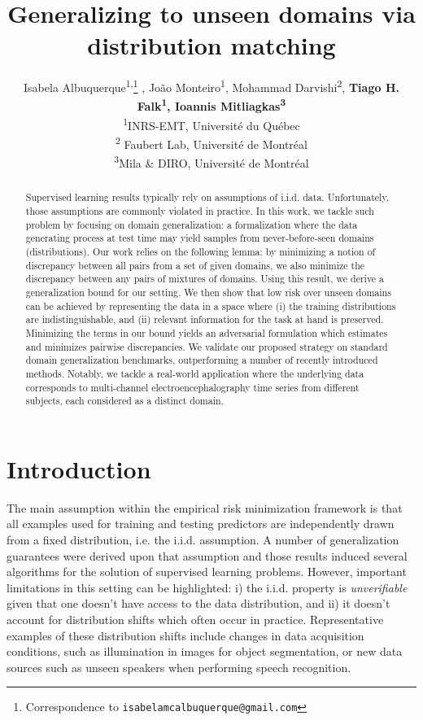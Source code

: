 \documentclass{article}
\title{Generalizing to unseen domains via distribution matching}
\author{Isabela Albuquerque\textsuperscript{1,}\thanks{Correspondence to \texttt{isabelamcalbuquerque@gmail.com}} , Jo\~ao Monteiro\textsuperscript{1}, Mohammad Darvishi\textsuperscript{2}, \textbf{Tiago H. Falk\textsuperscript{1}, Ioannis Mitliagkas\textsuperscript{3}}   
\\
\textsuperscript{1}INRS-EMT, Universit\'e du Qu\'ebec\\
\textsuperscript{2} Faubert Lab, Universit\'e de Montr\'eal \\ 
\textsuperscript{3}Mila \& DIRO, Universit\'e de Montr\'eal}
\begin{document}
\maketitle

\begin{abstract}






Supervised learning results typically rely on assumptions of i.i.d. data. Unfortunately, those assumptions are commonly violated in practice. In this work, we tackle such problem by focusing on domain generalization: a formalization where the data generating process at test time may yield samples from never-before-seen domains (distributions).
Our work relies on the following lemma: by minimizing a notion of discrepancy between all pairs from a set of given domains, we also minimize the discrepancy between any pairs of mixtures of domains. Using this result, we derive a generalization bound for our setting. We then show that low risk over unseen domains can be achieved by representing the data in a space where (i) the training distributions are indistinguishable, and (ii) relevant information for the task at hand is preserved. Minimizing the terms in our bound yields an adversarial formulation which estimates and minimizes pairwise discrepancies.
We validate our proposed strategy on standard domain generalization benchmarks, outperforming a number of recently introduced methods.
Notably, we tackle a real-world application where the underlying data corresponds to multi-channel electroencephalography time series from different subjects, each considered as a distinct domain.



\end{abstract}

\section{Introduction}
The main assumption within the empirical risk minimization framework is that all examples used for training and testing predictors are independently drawn from a fixed distribution, i.e. the i.i.d. assumption. A number of generalization guarantees were derived upon that assumption and those results induced several algorithms for the solution of supervised learning problems. However, important limitations in this setting can be highlighted: i) the i.i.d. property is \emph{unverifiable} \cite{langford2005tutorial} given that one doesn't have access to the data distribution, and  ii) it doesn't account for distribution shifts which often occur in practice. Representative examples of these distribution shifts include changes in data acquisition conditions, such as illumination in images for object segmentation, or new data sources such as unseen speakers when performing speech recognition.
\end{document}
